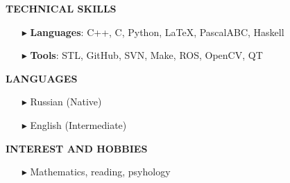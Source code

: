 \documentclass[a4paper,10pt]{article}
\begin{document}
	
	
	\colorbox{magicmint}{
		\begin{minipage}{0.96\textwidth}
			\vphantom{.}
			\textbf{TECHNICAL SKILLS}
		\end{minipage}
	}
	\begin{itemize}
		\item [$\blacktriangleright$]  \textbf{Languages}: C++, C, Python, \LaTeX, PascalABC, Haskell
		\item [$\blacktriangleright$]  \textbf{Tools}: STL, GitHub, SVN, Make, ROS, OpenCV, QT
	\end{itemize}
	 
	
	\colorbox{magicmint}{
		\begin{minipage}{0.96\textwidth}
			\vphantom{.}
			\textbf{LANGUAGES}
		\end{minipage}
	}
	\begin{itemize}
		\item[$\blacktriangleright$]  Russian (Native)
		\item[$\blacktriangleright$]  English (Intermediate)
	\end{itemize}
	
	
	\colorbox{magicmint}{
		\begin{minipage}{0.96\textwidth}
			\vphantom{.}
			\textbf{INTEREST AND HOBBIES}
		\end{minipage}
	}
	\begin{itemize}
		\item[$\blacktriangleright$]  Mathematics, reading, psyhology
	\end{itemize}
	
\end{document}
